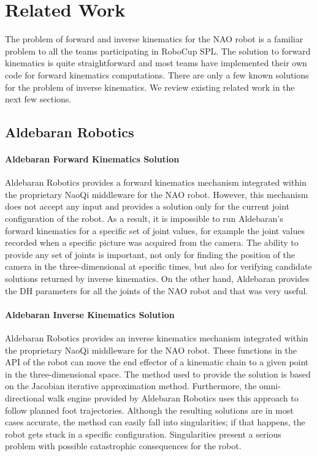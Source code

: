 \chapter{Related Work}
\label{related}

The problem of forward and inverse kinematics for the NAO robot is a familiar problem to all the teams participating in RoboCup SPL. The solution to forward kinematics is quite straightforward and most teams have implemented their own code for forward kinematics computations. There are only a few known solutions for the problem of inverse kinematics. We review existing related work in the next few sections. 

\section{Aldebaran Robotics}

\subsubsection*{Aldebaran Forward Kinematics Solution}
Aldebaran Robotics provides a forward kinematics mechanism integrated within the proprietary NaoQi middleware for the NAO robot. However, this mechanism does not accept any input and provides a solution only for the current joint configuration of the robot. As a result, it is impossible to run Aldebaran's forward kinematics for a specific set of joint values, for example the joint values recorded when a specific picture was acquired from the camera. The ability to provide any set of joints is important, not only for finding the position of the camera in the three-dimensional at specific times, but also for verifying candidate solutions returned by inverse kinematics. On the other hand, Aldebaran provides the DH parameters for all the joints of the NAO robot and that was very useful.

\subsubsection*{Aldebaran Inverse Kinematics Solution}
Aldebaran Robotics provides an inverse kinematics mechanism integrated within the proprietary NaoQi middleware for the NAO robot. These functions in the API of the robot can move the end effector of a kinematic chain to a given point in the three-dimensional space. The method used to provide the solution is based on the Jacobian iterative approximation method. Furthermore, the omni-directional walk engine provided by Aldebaran Robotics uses this approach to follow planned foot trajectories. Although the resulting solutions are in most cases accurate, the method can easily fall into singularities; if that happens, the robot gets stuck in a specific configuration. Singularities present a serious problem with possible catastrophic consequences for the robot. 

